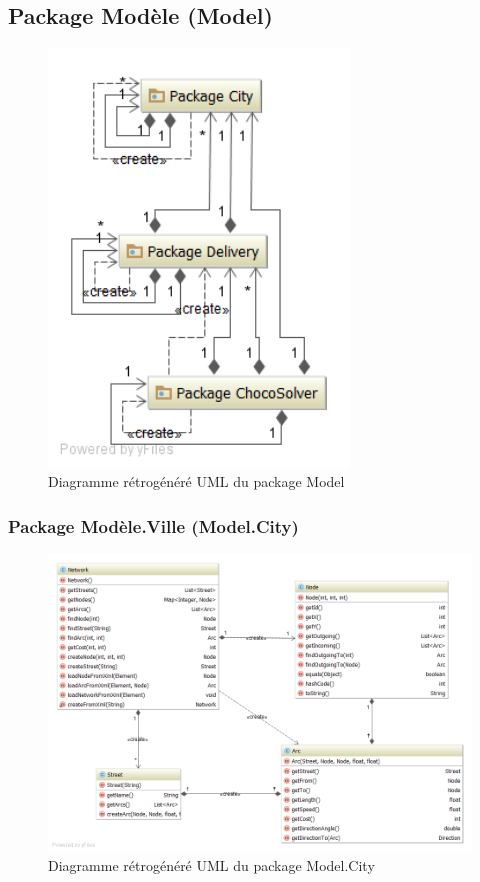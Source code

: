 \subsection{Package Mod\`ele (Model)}

\begin{figure}[h]
    \centering
    \includegraphics[width=80mm]{../diagrams/classes_packages/final_classes_packages/model/package_model.png}
    \caption{Diagramme r\'etrog\'en\'er\'e UML du package Model}
    \label{diagram:gen_uml_model}
\end{figure}
\pagebreak

\subsubsection{Package Mod\`ele.Ville (Model.City)}

\begin{figure}[h]
    \centering
    \includegraphics[width=160mm]{../diagrams/classes_packages/final_classes_packages/model/city.png}
    \caption{Diagramme r\'etrog\'en\'er\'e UML du package Model.City}
    \label{diagram:gen_uml_model_city}
\end{figure}
\pagebreak


